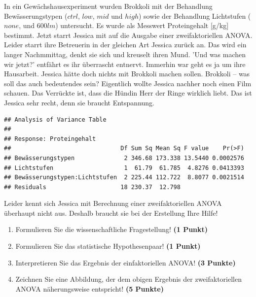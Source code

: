 \documentclass[a4paper, 9pt]{scrartcl}\usepackage[]{graphicx}\usepackage[]{xcolor}
\makeatletter
\newenvironment{kframe}{%
 \def\at@end@of@kframe{}%
 \ifinner\ifhmode%
  \def\at@end@of@kframe{\end{minipage}}%
  \begin{minipage}{\columnwidth}%
 \fi\fi%
 \def\FrameCommand##1{\hskip\@totalleftmargin \hskip-\fboxsep
 \colorbox{shadecolor}{##1}\hskip-\fboxsep
     \hskip-\linewidth \hskip-\@totalleftmargin \hskip\columnwidth}%
 \MakeFramed {\advance\hsize-\width
   \@totalleftmargin\z@ \linewidth\hsize
   \@setminipage}}%
 {\par\unskip\endMakeFramed%
 \at@end@of@kframe}
\newenvironment{knitrout}{}{} %
\makeatother
\begin{document}
In ein Gewächshausexperiment wurden Brokkoli mit der Behandlung Bewässerungstypen ($ctrl$, $low$, $mid$ und $high$) sowie der Behandlung Lichtstufen ($none$, und $600lm$) untersucht. Es wurde als Messwert Proteingehalt [g/kg] bestimmt. Jetzt starrt Jessica mit auf die \Rlogo Ausgabe einer zweifaktoriellen ANOVA. Leider starrt ihre Betreuerin in der gleichen Art Jessica zurück an. Das wird ein langer Nachmmittag, denkt sie sich und kreuselt ihren Mund. 'Und was machen wir jetzt?' entfährt es ihr überrascht entnervt. Immerhin war geht es ja um ihre Hausarbeit. Jessica hätte doch nichts mit Brokkoli machen sollen. Brokkoli -- was soll das auch bedeutendes sein? Eigentlich wollte Jessica nachher noch einen Film schauen. Das Verrückte ist, dass die Hündin Herr der Ringe wirklich liebt. Das ist Jessica sehr recht, denn sie braucht Entspannung.

\begin{knitrout}
\color{fgcolor}\begin{kframe}
\begin{verbatim}
## Analysis of Variance Table
## 
## Response: Proteingehalt
##                               Df Sum Sq Mean Sq F value    Pr(>F)
## Bewässerungstypen              2 346.68 173.338 13.5440 0.0002576
## Lichtstufen                    1  61.79  61.785  4.8276 0.0413393
## Bewässerungstypen:Lichtstufen  2 225.44 112.722  8.8077 0.0021514
## Residuals                     18 230.37  12.798
\end{verbatim}
\end{kframe}
\end{knitrout}

\vspace{1ex}

Leider kennt sich Jessica mit Berechnung einer zweifaktoriellen ANOVA überhaupt nicht aus. Deshalb braucht sie bei der Erstellung Ihre Hilfe! 

\begin{enumerate}
  \item Formulieren Sie die wissenschaftliche Fragestellung! \textbf{(1 Punkt)}
  \item Formulieren Sie das statistische Hypothesenpaar! \textbf{(1 Punkt)}
\item Interpretieren Sie das Ergebnis der einfaktoriellen ANOVA! \textbf{(3 Punkte)} 
\item Zeichnen Sie eine Abbildung, der dem obigen Ergebnis der
  zweifaktoriellen ANOVA näherungsweise entspricht! \textbf{(5 Punkte)}
\end{enumerate}
 
\end{document}
